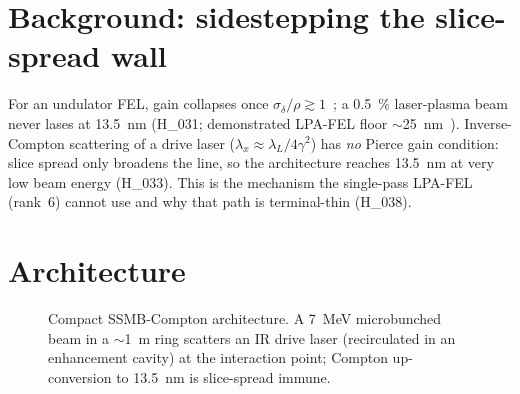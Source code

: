 \documentclass[11pt,a4paper]{article}
\newcommand{\hyp}[1]{\textcolor{blue!45!black}{\textsf{\small #1}}}
\begin{document}
\section{Background: sidestepping the slice-spread wall}
For an undulator FEL, gain collapses once $\sigma_\delta/\rho\gtrsim1$~\citep{mingxie}; a
\SI{0.5}{\percent} laser-plasma beam never lases at \SI{13.5}{\nano\meter} (\hyp{H\_031}; demonstrated
LPA-FEL floor $\sim$\SI{25}{\nano\meter}~\citep{xiao2026}). Inverse-Compton scattering of a drive
laser ($\lambda_x\approx\lambda_L/4\gamma^{2}$) has \emph{no} Pierce gain condition: slice spread only
broadens the line, so the architecture reaches \SI{13.5}{\nano\meter} at very low beam energy
(\hyp{H\_033}). This is the mechanism the single-pass LPA-FEL (rank~6) cannot use and why that path is
terminal-thin (\hyp{H\_038}).

\section{Architecture}
\label{sec:arch}
\begin{figure}[t]
\centering
{}
\caption{Compact SSMB-Compton architecture. A \SI{7}{\mega\electronvolt} microbunched beam in a
$\sim$\SI{1}{\meter} ring scatters an IR drive laser (recirculated in an enhancement cavity) at the
interaction point; Compton up-conversion to \SI{13.5}{\nano\meter} is slice-spread immune.}
\label{fig:arch}
\end{figure}
\end{document}
